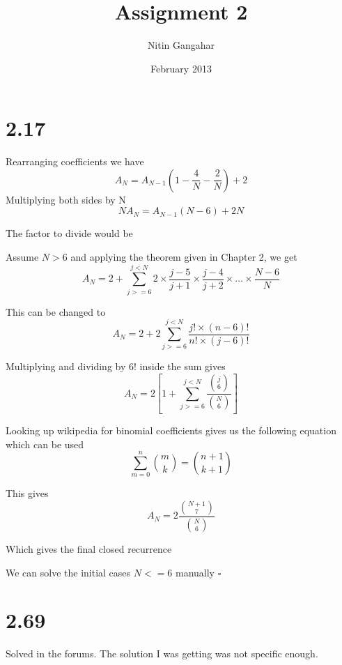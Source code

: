 \documentclass[a4paper,12pt]{article}
\begin{document}
\title{Assignment 2}
\author{Nitin Gangahar}
\date{February 2013}
\maketitle

\section*{2.17}
	Rearranging coefficients we have
	\begin{equation}
		A_N = A_{N-1}(1-\frac{4}{N}-\frac{2}{N}) + 2
	\end{equation}
	Multiplying both sides by N
	\begin{equation}
		N A_N = A_{N-1} (N-6) + 2N
	\end{equation}

	The factor to divide would be 
	\centerline{}

	Assume $N>6$ and applying the theorem given in Chapter 2, we get
	\begin{equation}
		A_N = 2 + \sum_{j>=6}^{j<N} 2 \times \frac{j-5}{j+1} \times \frac{j-4}{j+2} \times \ldots \times \frac{N-6}{N}
	\end{equation}

	This can be changed to
	\begin{equation*}
		A_N = 2 + 2 \sum_{j>=6}^{j<N} \frac{j! \times (n-6)!}{n! \times (j-6)!}
	\end{equation*}

	Multiplying and dividing by $6!$ inside the sum gives
	\begin{equation}
		A_N = 2 [ 1 + \sum_{j>=6}^{j<N} \frac{\binom{j}{6}}{\binom{N}{6}} ]
	\end{equation}

	Looking up wikipedia for binomial coefficients gives us the following equation which can be used
	\begin{equation}
		\sum_{m=0}^{n} \binom{m}{k} = \binom{n+1}{k+1}
	\end{equation}

	This gives
	\begin{equation}
		A_N = 2 \frac{\binom{N+1}{7}}{\binom{N}{6}}
	\end{equation}

	Which gives the final closed recurrence
	\centerline{
	}
	We can solve the initial cases $N<=6$ manually
	$\square$
\section*{2.69}
	Solved in the forums. The solution I was getting was not specific enough. 
\end{document}
